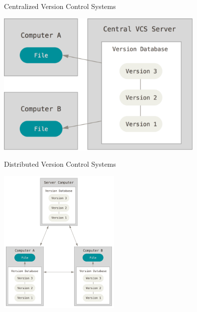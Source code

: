 \begin{frame}[t]{Centralized Version Control Systems}
  \begin{center}
    \includegraphics[height=2.75in]{../images/02-getting-started/centralized}
  \end{center}
\end{frame}

\begin{frame}[t]{Distributed Version Control Systems}
  \begin{center}
    \includegraphics[height=2.75in]{../images/02-getting-started/distributed}
  \end{center}
\end{frame}

